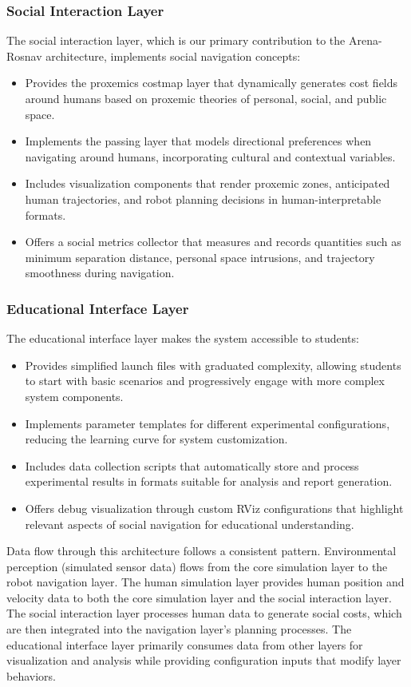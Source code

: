 \subsubsection{Social Interaction Layer}
The social interaction layer, which is our primary contribution to the Arena-Rosnav 
architecture, implements social navigation concepts:
\begin{itemize}
    \item Provides the proxemics costmap layer that dynamically generates cost fields 
    around humans based on proxemic theories of personal, social, and public space.
    \item Implements the passing layer that models directional preferences when 
    navigating around humans, incorporating cultural and contextual variables.
    \item Includes visualization components that render proxemic zones, anticipated 
    human trajectories, and robot planning decisions in human-interpretable formats.
    \item Offers a social metrics collector that measures and records quantities such 
    as minimum separation distance, personal space intrusions, and trajectory 
    smoothness during navigation.
\end{itemize}

\subsubsection{Educational Interface Layer}
The educational interface layer makes the system accessible to students:
\begin{itemize}
    \item Provides simplified launch files with graduated complexity, allowing students 
    to start with basic scenarios and progressively engage with more complex system 
    components.
    \item Implements parameter templates for different experimental configurations, 
    reducing the learning curve for system customization.
    \item Includes data collection scripts that automatically store and process 
    experimental results in formats suitable for analysis and report generation.
    \item Offers debug visualization through custom RViz configurations that highlight 
    relevant aspects of social navigation for educational understanding.
\end{itemize}
Data flow through this architecture follows a consistent pattern. Environmental perception 
(simulated sensor data) flows from the core simulation layer to the robot navigation layer. 
The human simulation layer provides human position and velocity data to both the core 
simulation layer and the social interaction layer. The social interaction layer processes 
human data to generate social costs, which are then integrated into the navigation layer's 
planning processes. The educational interface layer primarily consumes data from other 
layers for visualization and analysis while providing configuration inputs that modify 
layer behaviors.


